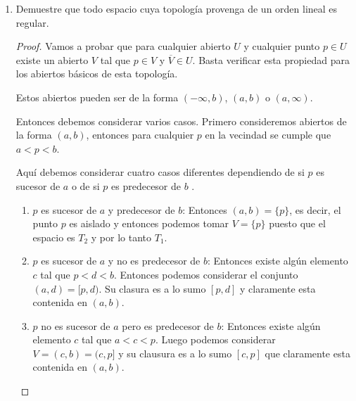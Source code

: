 \documentclass[paper=letter, fontsize=11pt]{scrartcl} %
\numberwithin{equation}{section} %
\numberwithin{figure}{section} %
\numberwithin{table}{section} %
\begin{document}
\begin{enumerate}
\begin{enumerate}
\begin{proof}
Entonces tome como función continua la función identidad $ i:(X,\tau') \to (X, \tau) $ tal que $ i(x)=x $.
Claramente la función es sobreyectiva. Además es continua porque la preimagen de cualquier abierto $ U \in \tau $ es $ i^{-1}(U)= U $ que es abierto en $ \tau' $ porque cualquier subconjunto es abierto en la topología discreta.

En particular si tomamos por ejemplo el espacio de Sierpinsky que ni siquiera es $ T_2 $ vemos que es la imagen continua del espacio discreto de 3 elementos que es métrico y por lo tanto $ T_4 $, por lo tanto la hipótesis de que la función sea cerrada es necesaria. 
\end{proof}
\end{enumerate}

\item Demuestre que todo espacio cuya topología provenga de un orden lineal es regular.
\begin{proof}
Vamos a probar que para cualquier abierto $ U $ y cualquier punto $ p \in U $ existe un abierto $ V $ tal que $ p \in V $ y $ \overline{V} \in U $. Basta verificar esta propiedad para los abiertos básicos de esta topología.

Estos abiertos pueden ser de la forma $ (-\infty,b) $, $ (a,b) $ o $ (a,\infty) $.

Entonces debemos considerar varios casos. Primero consideremos abiertos de la forma $ (a,b) $, entonces para cualquier $ p $ en la vecindad se cumple que $ a < p < b $.

Aquí debemos considerar cuatro casos diferentes dependiendo de si $ p $ es sucesor de $ a $ o de si $ p $ es predecesor de $b$ .

\begin{enumerate}
\item $ p $ es sucesor de $ a $ y predecesor de $ b $: Entonces $ (a,b) = \{p\} $, es decir, el punto $ p $ es aislado y entonces podemos tomar $ V = \{p\} $ puesto que el espacio es $ T_2 $ y por lo tanto $ T_1 $.
\item $ p $ es sucesor de $ a $ y no es predecesor de $ b $: Entonces existe algún elemento $ c $ tal que $ p<d<b $. Entonces podemos considerar el conjunto $ (a,d)=[p,d) $. Su clasura es a lo sumo $ [p,d] $ y claramente esta contenida en $(a,b)$.

\item $ p $ no es sucesor de $ a $ pero es predecesor de $ b $: Entonces existe algún elemento $ c $ tal que $ a < c < p $. Luego podemos considerar $ V = (c,b)=(c,p] $ y su clausura es a lo sumo $ [c,p] $ que claramente esta contenida en $ (a,b) $.


\end{enumerate}
\end{proof}
\end{enumerate}
\end{document}
